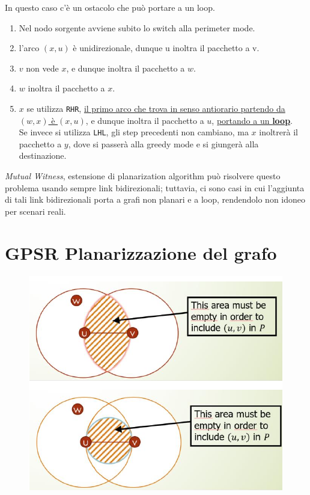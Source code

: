 In questo caso c'è un ostacolo che può portare a un loop.
\begin{enumerate}
   \item Nel nodo sorgente avviene subito lo switch alla perimeter mode.
   \item l'arco $(x,u)$ è unidirezionale, dunque u inoltra il pacchetto a v.
   \item $v$ non vede $x$, e dunque inoltra il pacchetto a $w$.
   \item $w$ inoltra il pacchetto a $x$.
   \item $x$ se utilizza \texttt{RHR}, \ul{il primo arco che trova in senso antiorario partendo da $(w,x)$ è $(x,u)$}, e dunque inoltra il pacchetto a $u$, \ul{portando a un \textbf{loop}}.\\
   Se invece si utilizza \texttt{LHL}, gli step precedenti non cambiano, ma $x$ inoltrerà il pacchetto a $y$, dove si passerà alla greedy mode e si giungerà alla destinazione.
\end{enumerate}

\textit{Mutual Witness}, estensione di planarization algorithm può risolvere questo problema usando sempre link bidirezionali; tuttavia, ci sono casi in cui l'aggiunta di tali link bidirezionali porta a grafi non planari e a loop, rendendolo non idoneo per scenari reali.

\section{GPSR Planarizzazione del grafo}

\begin{figure}[htbp]
   \centering
   \includegraphics{images/questions/Schermata del 2023-10-20 12-14-06.png}
   \label{fig:dom32}
\end{figure}


